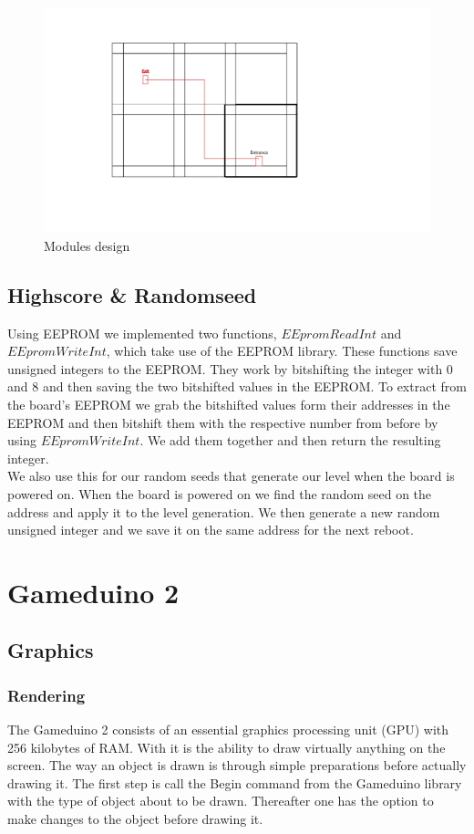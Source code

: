\begin{figure}[h]
  \centering
  \includegraphics[scale=0.5]{Figures/Modules}
  \caption{Modules design}
  \label{fig:Modules}
\end{figure}

\subsection*{Highscore \& Randomseed}
Using EEPROM we implemented two functions, $EEpromReadInt$ and $EEpromWriteInt$, which take use of the EEPROM library. These functions save unsigned integers to the EEPROM. They work by bitshifting the integer with 0 and 8 and then saving the two bitshifted values in the EEPROM. To extract from the board's EEPROM we grab the bitshifted values form their addresses in the EEPROM and then bitshift them with the respective number from before by using $EEpromWriteInt$. We add them together and then return the resulting integer.\\ We also use this for our random seeds that generate our level when the board is powered on. When the board is powered on we find the random seed on the address and apply it to the level generation. We then generate a new random unsigned integer and we save it on the same address for the next reboot.



\section{Gameduino 2}
\subsection*{Graphics}
\subsubsection*{Rendering}
The Gameduino 2 consists of an essential graphics processing unit (GPU) with 256 kilobytes of RAM. With it is the ability to draw virtually anything on the screen. The way an object is drawn is through simple preparations before actually drawing it. The first step is call the Begin command from the Gameduino library with the type of object about to be drawn. Thereafter one has the option to make changes to the object before drawing it. 

